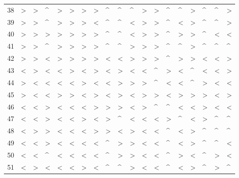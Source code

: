 \begin{tabular}{lllllllllllllllllll}
38  &  > &  > &  \textasciicircum  &  > &  > &  > &  > &  \textasciicircum  &  \textasciicircum  &  \textasciicircum  &  > &  > &  \textasciicircum  &  \textasciicircum  &  > &  \textasciicircum  &  \textasciicircum  &  > \\
39  &  > &  > &  \textasciicircum  &  > &  > &  > &  < &  \textasciicircum  &  \textasciicircum  &  < &  > &  > &  \textasciicircum  &  < &  > &  \textasciicircum  &  \textasciicircum  &  > \\
40  &  > &  > &  > &  > &  > &  > &  > &  \textasciicircum  &  \textasciicircum  &  < &  > &  > &  \textasciicircum  &  > &  > &  \textasciicircum  &  < &  < \\
41  &  > &  > &  \textasciicircum  &  > &  > &  > &  > &  \textasciicircum  &  \textasciicircum  &  > &  > &  > &  \textasciicircum  &  \textasciicircum  &  > &  \textasciicircum  &  \textasciicircum  &  \textasciicircum  \\
42  &  > &  > &  < &  > &  > &  > &  > &  < &  < &  > &  > &  > &  \textasciicircum  &  > &  > &  < &  < &  > \\
43  &  < &  > &  < &  < &  > &  < &  > &  < &  > &  < &  < &  \textasciicircum  &  > &  < &  \textasciicircum  &  < &  < &  > \\
44  &  > &  < &  < &  < &  < &  > &  < &  < &  > &  > &  > &  \textasciicircum  &  < &  < &  \textasciicircum  &  > &  < &  < \\
45  &  > &  < &  < &  > &  > &  < &  > &  < &  > &  < &  > &  > &  < &  > &  > &  > &  < &  > \\
46  &  < &  < &  > &  < &  < &  < &  > &  > &  > &  < &  > &  \textasciicircum  &  \textasciicircum  &  < &  < &  > &  < &  < \\
47  &  < &  < &  > &  < &  < &  > &  < &  > &  \textasciicircum  &  < &  < &  < &  > &  \textasciicircum  &  < &  > &  \textasciicircum  &  \textasciicircum  \\
48  &  < &  > &  > &  < &  < &  < &  > &  > &  < &  > &  < &  < &  \textasciicircum  &  < &  > &  \textasciicircum  &  \textasciicircum  &  \textasciicircum  \\
49  &  < &  < &  > &  < &  < &  < &  < &  \textasciicircum  &  > &  > &  < &  < &  \textasciicircum  &  < &  > &  \textasciicircum  &  \textasciicircum  &  < \\
50  &  < &  < &  \textasciicircum  &  < &  < &  < &  < &  \textasciicircum  &  > &  > &  < &  < &  \textasciicircum  &  > &  < &  \textasciicircum  &  > &  < \\
51  &  < &  > &  < &  < &  < &  > &  < &  \textasciicircum  &  \textasciicircum  &  > &  < &  < &  \textasciicircum  &  < &  > &  \textasciicircum  &  > &  \textasciicircum  \\

\end{tabular}
